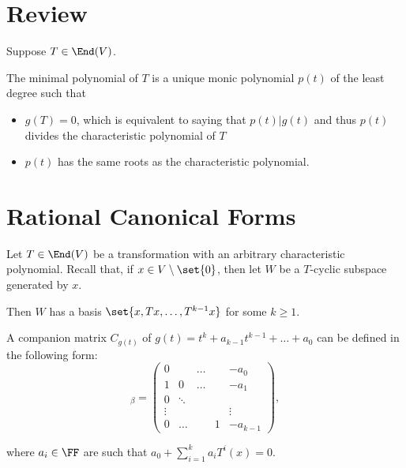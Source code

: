 \documentclass[11pt]{scrartcl}
\begin{document}
\section{Review}

Suppose $T \in \End(V)$.

The minimal polynomial of $T$ is a unique monic polynomial $p(t)$ of the least degree such that
\begin{itemize}
\item $g(T) = 0$, which is equivalent to saying that $p(t)|g(t)$ and
  thus $p(t)$ divides the characteristic polynomial of $T$
\item $p(t)$ has the same roots as the characteristic polynomial.
\end{itemize}
\section{Rational Canonical Forms}

Let $T \in \End(V)$ be a transformation with an arbitrary characteristic polynomial. Recall that, if $x\in V\setminus \set{0}$, then let $W$ be a $T$-cyclic subspace generated by $x$.

Then $W$ has a basis $\set{x, Tx, \dots, T^{k-1}x}$ for some $k\geq 1$.

A companion matrix $C_{g(t)}$ of $g(t) = t^k + a_{k-1}t^{k-1}+\dots + a_0$ can be defined in the following form:
\begin{equation*}
[T]_{\beta} = 
\begin{pmatrix}
0 & & \dots & & -a_0\\
1 & 0 & \dots & & -a_{1}\\
0&\ddots & & &\\
\vdots&&&&\vdots\\
0 & \dots & & 1 & -a_{k-1}
\end{pmatrix},
\end{equation*}

where $a_i\in \FF$ are such that $a_0 + \sum_{i=1}^k a_{i}T^{i}(x) = 0$.
\end{document}
